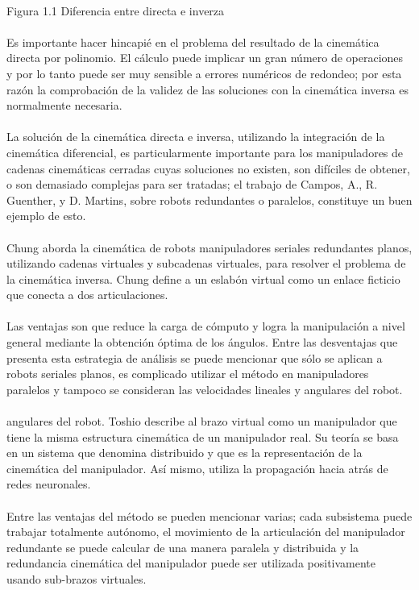 \documentclass[12pt,a4paper]{article}
\begin{document}
\\Figura 1.1 Diferencia entre directa e inverza
\\\\
Es importante hacer hincapié en el problema del resultado de la cinemática directa por polinomio. El cálculo puede implicar un gran número de operaciones y por lo tanto puede ser muy sensible a errores numéricos de redondeo; por esta razón la comprobación de la validez de las soluciones con la cinemática inversa es normalmente necesaria.
\\\\
La solución de la cinemática directa e inversa, utilizando la integración de la cinemática diferencial, es particularmente importante para los manipuladores de cadenas cinemáticas cerradas cuyas soluciones no existen, son difíciles de obtener, o son demasiado complejas para ser tratadas; el trabajo de Campos, A., R. Guenther, y D. Martins, sobre robots redundantes o paralelos, constituye un buen ejemplo de esto.
\\\\
Chung aborda la cinemática de robots manipuladores seriales redundantes planos, utilizando cadenas virtuales y subcadenas virtuales, para resolver el problema de la cinemática inversa. Chung define a un eslabón virtual como un enlace ficticio que conecta a dos articulaciones. 
\\\\
Las ventajas son que reduce la carga de cómputo y logra la manipulación a nivel general mediante la obtención óptima de los ángulos. Entre las desventajas que presenta esta estrategia de análisis se puede mencionar que sólo se aplican a robots seriales planos, es complicado utilizar el método en manipuladores paralelos y tampoco se consideran las velocidades lineales y angulares del robot.
\\\\
angulares del robot.
Toshio describe al brazo virtual como un manipulador que tiene la misma estructura cinemática de un manipulador real. Su teoría se basa en un sistema que denomina distribuido y que es la representación de la cinemática del manipulador. Así mismo, utiliza la propagación hacia atrás de redes neuronales. 
\\\\
Entre las ventajas del método se pueden mencionar varias; cada subsistema puede trabajar totalmente autónomo, el movimiento de la articulación del manipulador redundante se puede calcular de una manera paralela y distribuida y la redundancia cinemática del manipulador puede ser utilizada positivamente usando sub-brazos virtuales. 
\end{document}
